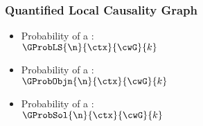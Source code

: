 \begin{frame}
\frametitle{Quantified Local Causality Graph}

 \begin{itemize}
  
 \item Probability of a :\\
 $\GProbLS{\n}{\ctx}{\cwG}{k}$\\
 \medskip
 \pause
 \item Probability of a :\\
 $\GProbObjn{\n}{\ctx}{\cwG}{k}$\\
 \medskip
 \pause
 \item Probability of a :\\
 $\GProbSol{\n}{\ctx}{\cwG}{k}$
 \end{itemize}
 \pause
   \begin{center}\scalebox{\scaleex}{
    
    \exqlcggaidef
   
   }\end{center}
   


\end{frame}
